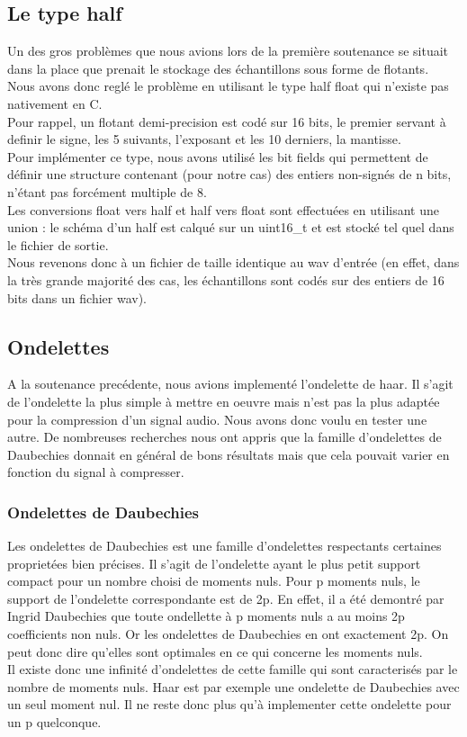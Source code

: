 \documentclass[a4paper,12pt]{article}
\begin{document}
	\subsection{Le type half}
Un des gros problèmes que nous avions lors de la première soutenance se situait
dans la place que prenait le stockage des échantillons sous forme de flotants.\\
Nous avons donc reglé le problème en utilisant le type half float qui n'existe
pas nativement en C.\\
Pour rappel, un flotant demi-precision est codé sur 16 bits, le premier servant
à definir le signe, les 5 suivants, l'exposant et les 10 derniers, la
mantisse.\\
Pour implémenter ce type, nous avons utilisé les bit fields qui permettent de
définir une structure contenant (pour notre cas) des entiers non-signés de n
bits, n'étant pas forcément multiple de 8.\\
Les conversions float vers half et half vers float sont effectuées en utilisant
une union : le schéma d'un half est calqué sur un uint16\_t et est stocké tel
quel dans le fichier de sortie.\\
Nous revenons donc à un fichier de taille identique au wav d'entrée (en effet,
dans la très grande majorité des cas, les échantillons sont codés sur des
entiers de 16 bits dans un fichier wav).
	\subsection{Ondelettes}
A la soutenance precédente, nous avions implementé l'ondelette de
haar. Il s'agit de l'ondelette la plus simple à mettre en oeuvre mais
n'est pas la plus adaptée pour la compression d'un signal audio.
Nous avons donc voulu en tester une autre. De nombreuses recherches
nous ont appris que la famille d'ondelettes de Daubechies donnait en
général de bons résultats mais que cela pouvait varier en fonction du
signal à compresser.\\
\subsubsection{Ondelettes de Daubechies}
Les ondelettes de Daubechies est une famille d'ondelettes respectants
certaines proprietées bien précises. Il s'agit de l'ondelette ayant le
plus petit support compact pour un nombre choisi de moments nuls. Pour
p moments nuls, le support de l'ondelette correspondante est de 2p. En
effet, il a été demontré par Ingrid Daubechies que toute ondellette à
p moments nuls a au moins 2p coefficients non nuls. Or les ondelettes
de Daubechies en ont exactement 2p. On peut donc dire qu'elles sont
optimales en ce qui concerne les moments nuls.\\
Il existe donc une infinité d'ondelettes de cette famille qui sont
caracterisés par le nombre de moments nuls. Haar est par exemple une
ondelette de Daubechies avec un seul moment nul. Il ne reste donc plus
qu'à implementer cette ondelette pour un p quelconque.
\end{document}
